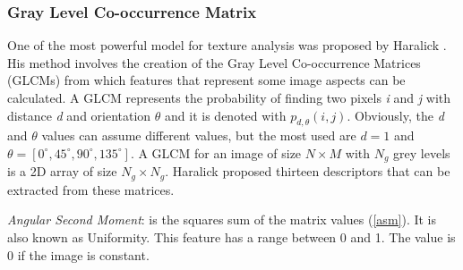 \subsubsection{Gray Level Co-occurrence Matrix} \label{GLCM}
One of the most powerful model for texture analysis was proposed by Haralick \cite{Haralick}. His method involves the creation of the Gray Level Co-occurrence Matrices (\acs{GLCM}s) from which features that represent some image aspects can be calculated. A GLCM represents the probability of finding two pixels \textit{i} and \textit{j} with distance \textit{d} and orientation $\theta$ and it is denoted with $p_{d,\theta}(i,j)$. Obviously, the \textit{d} and $\theta$ values can assume different values, but the most used are $d = 1$ and $\theta = [0 ^\circ, 45 ^\circ, 90 ^\circ, 135 ^\circ]$. A GLCM for an image of size $N \times M$ with $N_{g}$ grey levels is a 2D array of size $N_{g} \times N_{g}$. Haralick proposed thirteen descriptors that can be extracted from these matrices. 

\noindent\textit{Angular Second Moment}: is the squares sum of the matrix values (\ref{asm}). It is also known as Uniformity. This feature has a range between 0 and 1. The value is 0 if the image is constant.

